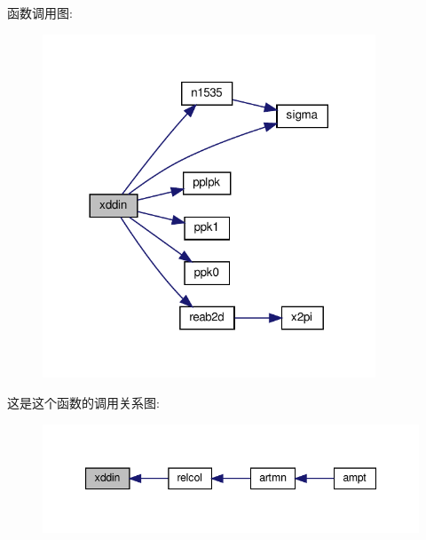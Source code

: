 函数调用图\+:
\nopagebreak
\begin{figure}[H]
\begin{center}
\leavevmode
\includegraphics[width=281pt]{xddin_8f90_afac99107af4953638fbc0ad8727771ec_cgraph}
\end{center}
\end{figure}
这是这个函数的调用关系图\+:
\nopagebreak
\begin{figure}[H]
\begin{center}
\leavevmode
\includegraphics[width=347pt]{xddin_8f90_afac99107af4953638fbc0ad8727771ec_icgraph}
\end{center}
\end{figure}
